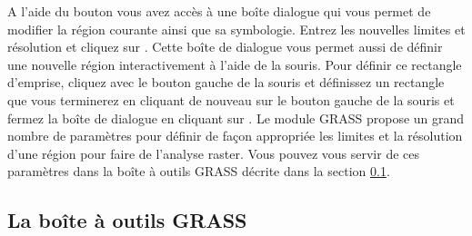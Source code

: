 A l'aide du bouton  vous avez acc\`es \`a une bo\^ite dialogue qui vous permet de modifier la r\'egion courante ainsi que sa symbologie. Entrez les nouvelles limites et r\'esolution et cliquez sur . Cette bo\^ite de dialogue vous permet aussi de d\'efinir une nouvelle r\'egion interactivement \`a l'aide de la souris. Pour d\'efinir ce rectangle d'emprise, cliquez avec le bouton gauche de la souris et d\'efinissez un rectangle que vous terminerez en cliquant de nouveau sur le bouton gauche de la souris et fermez la bo\^ite de dialogue en cliquant sur . Le module GRASS  propose un grand nombre de param\`etres pour d\'efinir de fa\c{c}on appropri\'ee les limites et la r\'esolution d'une r\'egion pour faire de l'analyse raster. Vous pouvez vous servir de ces param\`etres dans la bo\^ite \`a outils GRASS d\'ecrite dans la section \ref{subsec:grass_toolbox}.



\subsection{La bo\^ite \`a outils GRASS}\label{subsec:grass_toolbox} 

